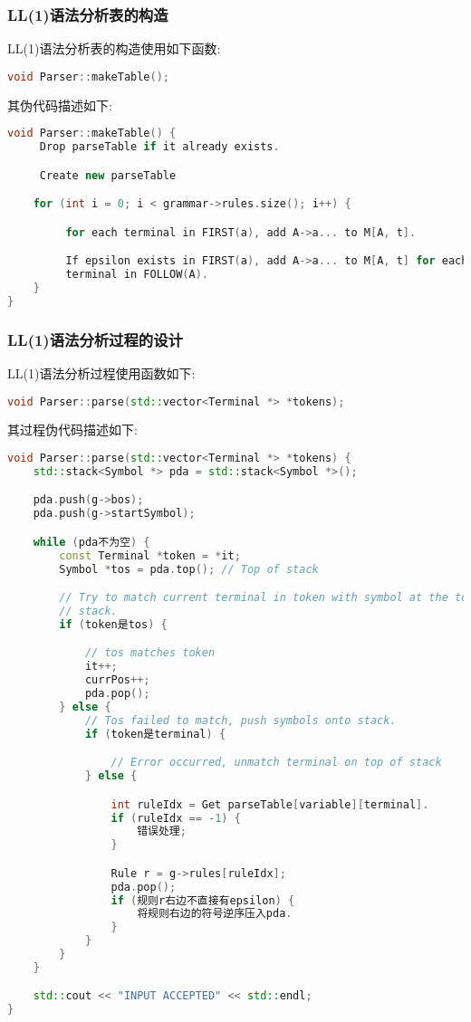\subsubsection{LL(1)语法分析表的构造}
LL(1)语法分析表的构造使用如下函数:

\begin{lstlisting}[language=c++]
void Parser::makeTable();
\end{lstlisting}
其伪代码描述如下:
\begin{lstlisting}[language=c++]
void Parser::makeTable() {
     Drop parseTable if it already exists.

     Create new parseTable

    for (int i = 0; i < grammar->rules.size(); i++) {

         for each terminal in FIRST(a), add A->a... to M[A, t].

         If epsilon exists in FIRST(a), add A->a... to M[A, t] for each
         terminal in FOLLOW(A).
    }
}
\end{lstlisting}

\subsubsection{LL(1)语法分析过程的设计}
LL(1)语法分析过程使用函数如下:
\begin{lstlisting}[language=c++]
void Parser::parse(std::vector<Terminal *> *tokens);
\end{lstlisting}
其过程伪代码描述如下:
\begin{lstlisting}[language=c++]
void Parser::parse(std::vector<Terminal *> *tokens) {
    std::stack<Symbol *> pda = std::stack<Symbol *>();

    pda.push(g->bos);
    pda.push(g->startSymbol);

    while (pda不为空) {
        const Terminal *token = *it;
        Symbol *tos = pda.top(); // Top of stack

        // Try to match current terminal in token with symbol at the top of
        // stack.
        if (token是tos) {

            // tos matches token
            it++;
            currPos++;
            pda.pop();
        } else {
            // Tos failed to match, push symbols onto stack.
            if (token是terminal) {

                // Error occurred, unmatch terminal on top of stack
            } else {

                int ruleIdx = Get parseTable[variable][terminal].
                if (ruleIdx == -1) {
                    错误处理;
                }

                Rule r = g->rules[ruleIdx];
                pda.pop();
                if (规则r右边不直接有epsilon) {
                    将规则右边的符号逆序压入pda.
                }
            }
        }
    }

    std::cout << "INPUT ACCEPTED" << std::endl;
}
\end{lstlisting}

